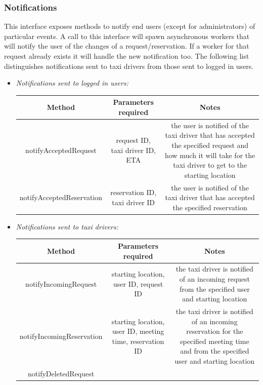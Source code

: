 \documentclass{article}
\begin{document}
\begin{itemize}
\subsubsection{Notifications} %
This interface exposes methods to notify end users (except for administrators) of particular events. 
A call to this interface will spawn asynchronous workers that will notify the user of the changes of a request/reservation.
If a worker for that request already exists it will handle the new notification too.
The following list distinguishes notifications sent to taxi drivers from those sent to logged in users.
\begin{itemize}
	\item \textit{Notifications sent to logged in users:} \\
		\begin{adjustbox}{width=1.2\textwidth}	
			\begin{tabular}{*{3}{c}}
				\toprule
				Method & Parameters required & Notes \\
				\midrule
				notifyAcceptedRequest & request ID, taxi driver ID, ETA & the user is notified of the taxi driver that has accepted the specified request and how much it will take for the taxi driver to get to the starting location\\ 
				notifyAcceptedReservation & reservation ID, taxi driver ID & the user is notified of the taxi driver that has accepted the specified reservation \\
				\bottomrule
			\end{tabular}
		\end{adjustbox}	
	\item \textit{Notifications sent to taxi drivers:} \\
		\begin{adjustbox}{width=1.2\textwidth}	
			\begin{tabular}{*{3}{c}}
				\toprule
				Method & Parameters required & Notes \\
				\midrule
				notifyIncomingRequest & starting location, user ID, request ID & the taxi driver is notified of an incoming request from the specified user and starting location\\ 
				notifyIncomingReservation & starting location, user ID, meeting time, reservation ID & the taxi driver is notified of an incoming reservation for the specified meeting time and from the specified user and starting location \\
				notifyDeletedRequest %
				\bottomrule
			\end{tabular}
		\end{adjustbox}	
\end{itemize}		
\end{itemize}
\end{document}
